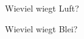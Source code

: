 \documentclass[12pt,ngerman,answers]{exam}
\begin{document}
\begin{questions}
\question[5] Wieviel wiegt Luft?

\makeemptybox{3cm}

\question[5] Wieviel wiegt Blei?



\end{questions}
\end{document}
